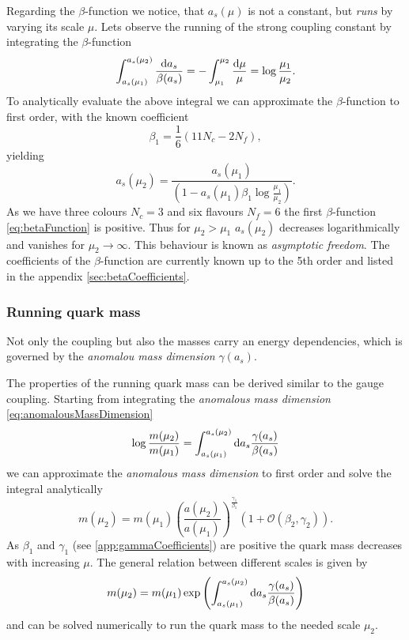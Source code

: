 \documentclass[../../index.tex]{subfiles}
\begin{document}
Regarding the $\beta$-function we notice, that $a_s(\mu)$ is not a constant, but
\textit{runs} by varying its scale $\mu$. Lets observe the running of the strong
coupling constant by integrating the $\beta$-function 
\begin{equation}
  \int_{a_s(\mu_1)}^{a_s(\mu_2)}\frac{\dif a_s}{\beta(a_s)} = - \int_{\mu_1}^{\mu_2} \frac{\dif \mu}{\mu} = \log \frac{\mu_1}{\mu_2}.
\end{equation}
To analytically evaluate the above integral we can approximate the $\beta$-function to first order, with the known
coefficient
\begin{equation}
  \beta_1 = \frac{1}{6}(11 N_c - 2 N_f),
\end{equation}
yielding
\begin{equation}
  a_s(\mu_2) = \frac{a_s(\mu_1)}{\left( 1 - a_s(\mu_1) \beta_1 \log\frac{\mu_1}{\mu_2} \right)}.
\end{equation}
As we have three colours $N_c=3$ and six flavours $N_f=6$ the first
$\beta$-function \ref{eq:betaFunction} is positive. Thus for $\mu_2>\mu_1$ $a_s(\mu_2)$ decreases
logarithmically and vanishes for $\mu_2 \to \infty$. This behaviour is known as
\textit{asymptotic freedom}.
The coefficients of the $\beta$-function are currently known up to the 5th
order and listed in the appendix \ref{sec:betaCoefficients}.

\subsubsection{Running quark mass}
Not only the coupling but also the masses carry an energy dependencies, which is
governed by the \textit{anomalou mass dimension} $\gamma(a_s)$.

The properties of the running quark mass can be derived similar to the gauge
coupling. Starting from integrating the \textit{anomalous mass dimension} \ref{eq:anomalousMassDimension}
\begin{equation}
  \log \frac{m(\mu_2)}{m(\mu_1)} = \int_{a_s(\mu_1)}^{a_s(\mu_2)} \dif a_s \frac{\gamma(a_s)}{\beta(a_s)}
\end{equation}
we can approximate the \textit{anomalous mass dimension} to first order and
solve the integral analytically \cite{Schwab2002}
\begin{equation}
  m(\mu_2) = m(\mu_1)\left( \frac{a(\mu_2)}{a(\mu_1)} \right)^{\frac{\gamma_1}{\beta_1}} \left( 1 + \mathcal{O}(\beta_2, \gamma_2) \right).
\end{equation}
As $\beta_1$ and $\gamma_1$ (see \ref{app:gammaCoefficients}) are positive the
quark mass decreases with increasing $\mu$.
The general relation between different scales is given by
\begin{equation}
  m(\mu_2) = m(\mu_1) \exp \left( \int_{a_s(\mu_1)}^{a_s(\mu_2)} \dif a_s \frac{\gamma(a_s)}{\beta(a_s)}  \right)
\end{equation}
and can be solved numerically to run the quark mass to the needed scale $\mu_2$.
\end{document}
